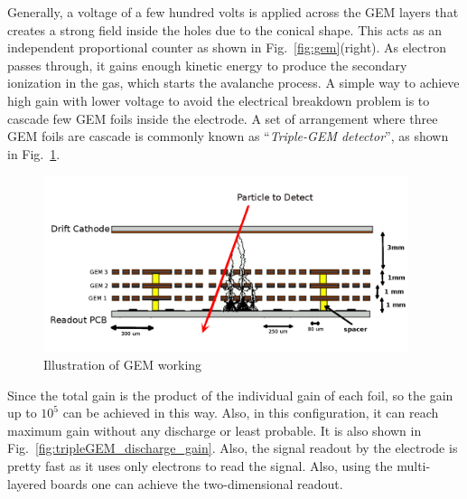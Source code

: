 Generally, a voltage of a few hundred volts is applied across the GEM layers that creates a strong field inside the holes due to the conical shape. 
This acts as an independent proportional counter as shown in Fig.~\ref{fig:gem}(right). As electron passes through, it gains enough kinetic energy to produce the secondary ionization in the gas, which starts the avalanche process. 
A simple way to achieve high gain with lower voltage to avoid the electrical breakdown problem is to cascade few GEM foils inside the electrode. 
A set of arrangement where three GEM foils are cascade is commonly known as ``\textit{Triple-GEM detector}'', as shown in Fig.~\ref{fig:gemgaps}.
\begin{figure}[!htbp]
    \begin{center}
        \includegraphics[width=0.95\textwidth]{figures/GEM/triple_gem.png}
        \caption{Illustration of GEM working}
        \label{fig:gemgaps}
    \end{center}
\end{figure} 
Since the total gain is the product of the individual gain of each foil, so the gain up to $10^5$ can be achieved in this way.
Also, in this configuration, it can reach maximum gain without any discharge or least probable. It is also shown in Fig.~\ref{fig:tripleGEM_discharge_gain}. 
Also, the signal readout by the electrode is pretty fast as it uses only electrons to read the signal. 
Also, using the multi-layered boards one can achieve the two-dimensional readout.
